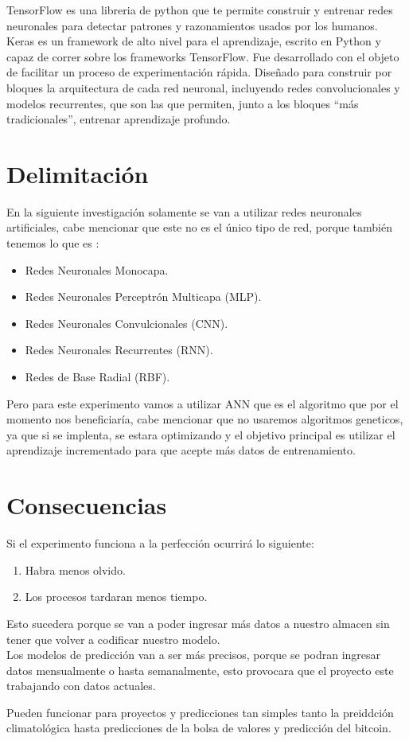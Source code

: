         TensorFlow es una libreria de python que te permite construir y entrenar redes neuronales para detectar patrones y
        razonamientos usados por los humanos. \\

        Keras es un framework de alto nivel para el aprendizaje, escrito en Python y capaz de correr sobre los 
        frameworks TensorFlow. Fue desarrollado con el objeto de facilitar un proceso de experimentación rápida. Diseñado para construir por bloques la arquitectura de cada red neuronal, incluyendo redes convolucionales y modelos recurrentes, que son las que permiten, junto a los bloques “más tradicionales”, entrenar aprendizaje profundo.


\section{Delimitación}
            
    En la siguiente investigación solamente se van a utilizar redes neuronales artificiales, cabe mencionar que este no es el único tipo de red, porque también tenemos lo que es \cite{royo2021}:
    \begin{itemize}
        \item Redes Neuronales Monocapa.
        \item Redes Neuronales Perceptrón Multicapa (MLP).
        \item Redes Neuronales Convulcionales (CNN).
        \item Redes Neuronales Recurrentes (RNN).
        \item Redes de Base Radial (RBF).
    \end{itemize}
    Pero para este experimento vamos a utilizar ANN que es el algoritmo que por el momento nos beneficiaría, cabe mencionar que no usaremos algoritmos geneticos, ya que si se implenta, se estara
    optimizando y el objetivo principal es utilizar el aprendizaje incrementado para que acepte más datos de entrenamiento.

\section{Consecuencias}

    Si el experimento funciona a la perfecci\'on ocurrir\'a lo siguiente:
    \begin{enumerate}
        \item Habra menos olvido.
        \item Los procesos tardaran menos tiempo.
    \end{enumerate}

    Esto sucedera porque se van a poder ingresar m\'as datos a nuestro almacen sin 
    tener que volver a codificar nuestro modelo.\\
    Los modelos de predicci\'on van a ser m\'as precisos, porque se podran ingresar 
    datos mensualmente o hasta semanalmente, esto provocara que el proyecto este trabajando 
    con datos actuales.

    Pueden funcionar para proyectos y predicciones tan simples tanto la preiddci\'on climatol\'ogica
    hasta predicciones de la bolsa de valores y predicci\'on del bitcoin.

